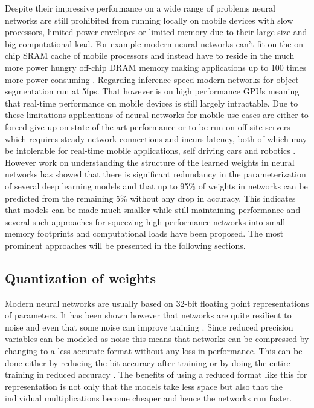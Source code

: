 \documentclass{kththesis}
\newcommand{\bibentry}[1]{\parencite{#1}}
\begin{document}
Despite their impressive performance on a wide range of problems neural networks
are still prohibited from running locally on mobile devices with slow
processors, limited power envelopes or limited memory due to their large size
and big computational load. For example modern neural networks can't fit on the
on-chip SRAM cache of mobile processors and instead have to reside in the much more power hungry
off-chip DRAM memory making applications up to 100 times more power consuming
\bibentry{han2015learning}. Regarding inference speed modern networks
for object segmentation \bibentry{he2017mask} run at 5fps. That however is on high
performance GPUs meaning that real-time performance on mobile devices is still
largely intractable. Due to
these limitations applications of neural networks for mobile use cases are
either to forced give up on state of the art performance or to be run on
off-site servers which requires steady network connections and incurs latency,
both of which may be intolerable for real-time mobile applications, self driving
cars and robotics \bibentry{jin2014flattened}. However work on understanding the
structure of the learned weights in neural networks
\bibentry{denil2013predicting} has showed that there is significant redundancy
in the parameterization of several deep learning models and that up to 95\% of
weights in networks can be predicted from the remaining 5\% without any drop in
accuracy. This indicates that models can be made much smaller while still
maintaining performance and several such approaches for squeezing high
performance networks into small memory footprints and computational loads have
been proposed. The most prominent approaches will be presented in the following
sections.  

\subsection{Quantization of weights}
Modern neural networks are usually based on 32-bit floating point
representations of parameters. It has been shown however that networks are quite
resilient to noise and even that some noise can improve training
\bibentry{murray1994enhanced}. Since reduced precision variables can be modeled
as noise this means that networks can be compressed by changing to a less
accurate format without any loss in performance. This can be done either by
reducing the bit accuracy after training \bibentry{vanhoucke2011improving}  or
by doing the entire training in reduced accuracy \bibentry{hubara2016quantized}
\bibentry{gupta2015deep}. The benefits of using a reduced format like this for
representation is not only that the models take less space but also that the
individual multiplications become cheaper and hence the networks run faster. 
\end{document}
